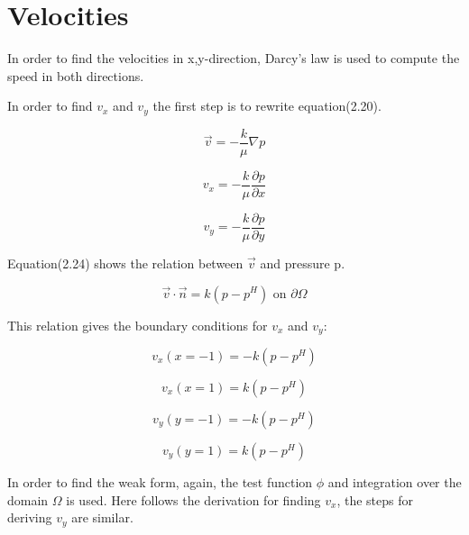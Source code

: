 \documentclass[a4paper]{report}
\begin{document}
\section{Velocities}

In order to find the velocities in x,y-direction, Darcy's law is used to compute the speed in both directions.


In order to find $v_x$ and $v_y$ the first step is to rewrite equation(2.20).

\begin{equation}
\vec{v}=-\frac{k}{\mu}\nabla p
\end{equation}

\begin{equation}
v_x=-\frac{k}{\mu}\frac{\partial p}{\partial x}
\end{equation}


\begin{equation}
v_y=-\frac{k}{\mu}\frac{\partial p}{\partial y}
\end{equation}

Equation(2.24) shows the relation between $\vec{v}$ and pressure p.

\begin{equation}
\vec{v}\cdot\vec{n}=k(p-p^H)\text{ on }\partial\Omega
\end{equation}

This relation gives the boundary conditions for $v_x$ and $v_y$:

\begin{equation}
v_x(x=-1)=-k(p-p^H)
\end{equation}


\begin{equation}
v_x(x=1)=k(p-p^H)
\end{equation}


\begin{equation}
v_y(y=-1)=-k(p-p^H)
\end{equation}


\begin{equation}
v_y(y=1)=k(p-p^H)
\end{equation}

%
%
In order to find the weak form, again, the test function $\phi$ and integration over the domain $\Omega$ is used. Here follows the derivation for finding $v_x$, the steps for deriving $v_y$ are similar.
\end{document}
